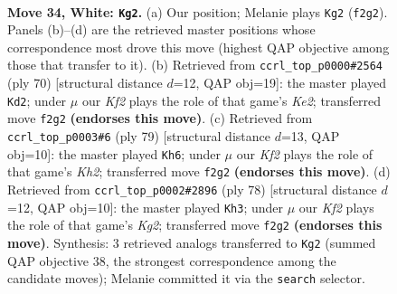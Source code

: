 \documentclass[11pt]{article}
\begin{document}
\clearpage

\begin{figure}[p]\centering
\begin{subfigure}{0.46\textwidth}\centering
\resizebox{\linewidth}{!}{%
\newchessgame
\chessboard[
  setfen={7r/6k1/8/8/p5p1/P7/5K1P/R7 w - - 2 34},
  showmover=false,
  pgfstyle=straightmove, color=movearrow, markmove={f2-g2}
]}
\caption{}
\end{subfigure}\hfill
\begin{subfigure}{0.46\textwidth}\centering
\resizebox{\linewidth}{!}{%
\newchessgame
\chessboard[
  setfen={1k6/2r5/p7/8/1p6/5R2/PPP1K3/8 w - - 2 36},
  showmover=false,
  pgfstyle=straightmove, color=movearrow, markmove={e2-d2}
]}
\caption{}
\end{subfigure}
\\[4pt]
\begin{subfigure}{0.46\textwidth}\centering
\resizebox{\linewidth}{!}{%
\newchessgame
\chessboard[
  setfen={1R6/7k/6p1/1pr5/7P/6K1/8/8 b - - 4 40},
  showmover=false,
  pgfstyle=straightmove, color=movearrow, markmove={h7-h6}
]}
\caption{}
\end{subfigure}\hfill
\begin{subfigure}{0.46\textwidth}\centering
\resizebox{\linewidth}{!}{%
\newchessgame
\chessboard[
  setfen={8/8/5p1k/7p/4r2P/8/1R3PK1/8 w - - 1 40},
  showmover=false,
  pgfstyle=straightmove, color=movearrow, markmove={g2-h3}
]}
\caption{}
\end{subfigure}
\caption{\textbf{Move 34, White: \texttt{Kg2}.} (a) Our position; Melanie plays \texttt{Kg2} (\texttt{f2g2}). Panels (b)--(d) are the retrieved master positions whose correspondence most drove this move (highest QAP objective among those that transfer to it). (b) Retrieved from \texttt{ccrl\_top\_p0000\#2564} (ply 70) [structural distance $d$=12, QAP obj=19]: the master played \texttt{Kd2}; under $\mu$ our \emph{Kf2} plays the role of that game's \emph{Ke2}; transferred move \texttt{f2g2} \textbf{(endorses this move)}. (c) Retrieved from \texttt{ccrl\_top\_p0003\#6} (ply 79) [structural distance $d$=13, QAP obj=10]: the master played \texttt{Kh6}; under $\mu$ our \emph{Kf2} plays the role of that game's \emph{Kh2}; transferred move \texttt{f2g2} \textbf{(endorses this move)}. (d) Retrieved from \texttt{ccrl\_top\_p0002\#2896} (ply 78) [structural distance $d$=12, QAP obj=10]: the master played \texttt{Kh3}; under $\mu$ our \emph{Kf2} plays the role of that game's \emph{Kg2}; transferred move \texttt{f2g2} \textbf{(endorses this move)}. Synthesis: 3 retrieved analogs transferred to \texttt{Kg2} (summed QAP objective 38, the strongest correspondence among the candidate moves); Melanie committed it via the \texttt{search} selector.}
\label{fig:thought-m66}
\end{figure}
\end{document}

